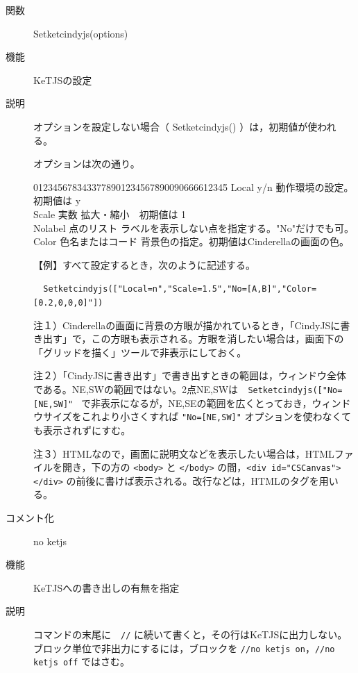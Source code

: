 \documentclass[papersize,a4paper,12pt,uplatex]{jsarticle}
\begin{document}
\begin{description}

\hypertarget{setketcindyjs}{}
\item[関数]Setketcindyjs(options)
\item[機能] KeTJSの設定
\item[説明] オプションを設定しない場合（ Setketcindyjs() ）は，初期値が使われる。

オプションは次の通り。

\begin{tabbing}
012345678\=3433778901234567\=890090666612345\=\kill
Local \> y/n \>動作環境の設定。 \>初期値は y\\
Scale \> 実数 \> 拡大・縮小　\>初期値は 1\\
Nolabel \> 点のリスト \> ラベルを表示しない点を指定する。"No"だけでも可。\\
Color \>  色名またはコード\> 背景色の指定。初期値はCinderellaの画面の色。\\
\end{tabbing}
【例】すべて設定するとき，次のように記述する。

\verb|  Setketcindyjs(["Local=n","Scale=1.5","No=[A,B]","Color=[0.2,0,0,0]"]) |

\vspace{\baselineskip}
注１）Cinderellaの画面に背景の方眼が描かれているとき，「CindyJSに書き出す」で，この方眼も表示される。方眼を消したい場合は，画面下の「グリッドを描く」ツールで非表示にしておく。

注２）「CindyJSに書き出す」で書き出すときの範囲は，ウィンドウ全体である。NE,SWの範囲ではない。2点NE,SWは\verb|  Setketcindyjs(["No=[NE,SW]" | で非表示になるが，NE,SEの範囲を広くとっておき，ウィンドウサイズをこれより小さくすれば \verb|"No=[NE,SW]"| オプションを使わなくても表示されずにすむ。

注３）HTMLなので，画面に説明文などを表示したい場合は，HTMLファイルを開き，下の方の \verb|<body>| と \verb|</body>| の間，\verb|<div id="CSCanvas"></div>| の前後に書けば表示される。改行などは，HTMLのタグを用いる。

\vspace{\baselineskip}
\hypertarget{setketcindy}{}
\item[コメント化] no ketjs
\item[機能] KeTJSへの書き出しの有無を指定
\item[説明] コマンドの末尾に　\verb|//| に続いて書くと，その行はKeTJSに出力しない。
ブロック単位で非出力にするには，ブロックを \verb|//no ketjs on|，\verb|//no ketjs off| ではさむ。


\end{description}
\end{document}
